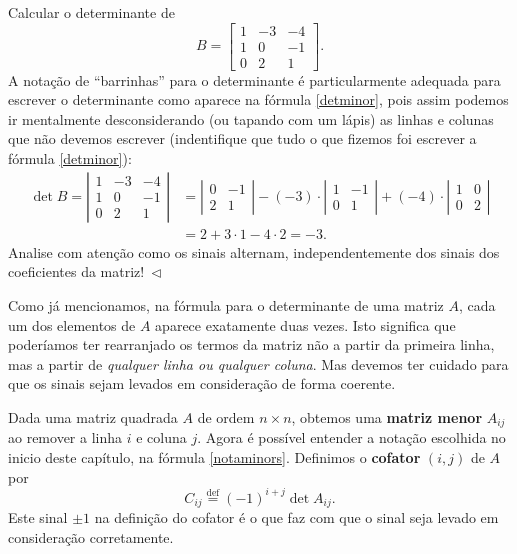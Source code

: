 \documentclass[../livro.tex]{subfiles}  %
\begin{document}
\begin{example}
	Calcular o determinante de
	\[
	B = \begin{bmatrix}
	1 & -3 & -4  \\
	1 & 0 & -1 \\
	0 & 2 & 1
	\end{bmatrix}.
	\] A notação de ``barrinhas'' para o determinante é particularmente adequada para escrever o determinante como aparece na fórmula \eqref{detminor}, pois assim podemos ir mentalmente desconsiderando (ou tapando com um lápis) as linhas e colunas que não devemos escrever (indentifique que tudo o que fizemos foi escrever a fórmula \eqref{detminor}):
        \begin{equation}
	\begin{split}
	\det B = \left| \begin{matrix}
	1 & -3 & -4  \\
    1 & 0  & -1  \\
    0 & 2  & 1
	\end{matrix} \right| & = \left| \begin{matrix}
	0 & -1 \\
	2 & 1
	\end{matrix} \right| - (-3) \cdot \left| \begin{matrix}
	1 &  -1 \\
	0 &  1
	\end{matrix} \right| + (-4) \cdot \left| \begin{matrix}
	1 & 0  \\
	0 & 2 
	\end{matrix} \right| \\ & = 2 + 3 \cdot 1  -4 \cdot 2 = -3.
	\end{split}
      \end{equation}
 Analise com atenção como os sinais alternam, independentemente dos sinais dos coeficientes da matriz!$ \ \lhd$
\end{example}


Como já mencionamos, na fórmula para o determinante de uma matriz $A$, cada um dos elementos de $A$ aparece exatamente duas vezes. Isto significa que poderíamos ter rearranjado os termos da matriz não a partir da primeira linha, mas a partir de \textit{qualquer linha ou qualquer coluna}. Mas devemos ter cuidado para que os sinais sejam levados em consideração de forma coerente.

Dada uma matriz quadrada $A$ de ordem $n \times n$, obtemos uma \textbf{matriz menor} $A_{ij}$ ao remover a linha $i$ e coluna $j$. Agora é possível entender a notação escolhida no inicio deste capítulo, na fórmula \eqref{notaminors}. Definimos o \textbf{cofator} $(i,j)$ de $A$ por
\[
C_{ij} \stackrel{\text{def}}{=} (-1)^{i + j} \det A_{ij}.
\] Este sinal $\pm 1$ na definição do cofator é o que faz com que o sinal seja levado em consideração corretamente.
\end{document}
